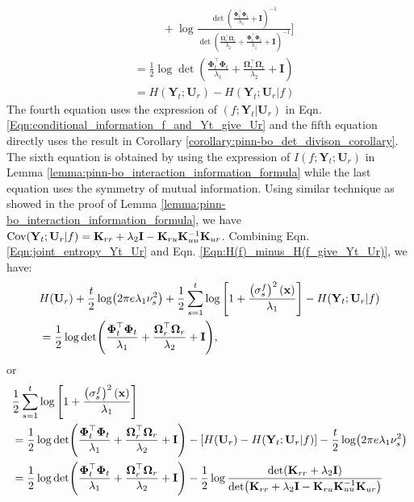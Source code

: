 \begin{align}
\\ 
        & \;\;\; \;\;\; \;\;\;  + \log \frac{\det\left(\frac{\boldsymbol{\Phi}_t^\top \boldsymbol{\Phi}_t}{\lambda_1} + \mathbf{I}\right)^{-1}}{\det \left(\frac{\boldsymbol{\Omega}_r^\top\boldsymbol{\Omega}_r}{\lambda_2}+\frac{\boldsymbol{\Phi}_t^\top \boldsymbol{\Phi}_t} {\lambda_1} + \mathbf{I}\right)^{-1}} \Bigg] \nonumber
\\
        &=\frac{1}{2}\log \det(\frac{\boldsymbol{\Phi}_t^\top \boldsymbol{\Phi}_t}{\lambda_1} + \frac{\boldsymbol{\Omega}_r^\top \boldsymbol{\Omega}_r}{\lambda_2} + \mathbf{I}) \label{Eqn:H(f)_minus_H(f_give_Yt_Ur)}
\\
        &=
        H(\mathbf{Y}_t; \mathbf{U}_r) - H(\mathbf{Y}_t; \mathbf{U}_r \rvert f)  \nonumber
    \end{align} 
    The fourth equation uses the expression of $(f;\mathbf{Y}_t\rvert\mathbf{U}_r)$ in Eqn. \eqref{Eqn:conditional_information_f_and_Yt_give_Ur} and the fifth equation directly uses the result in Corollary \ref{corollary:pinn-bo_det_divison_corollary}.
    The sixth equation is obtained by using the expression of $I(f;\mathbf{Y}_t; \mathbf{U}_r)$  in Lemma \ref{lemma:pinn-bo_interaction_information_formula} while the last equation uses the symmetry of mutual information.
    Using similar technique as showed in the proof of Lemma \ref{lemma:pinn-bo_interaction_information_formula}, we have $\textup{Cov}(\mathbf{Y}_t; \mathbf{U}_r \rvert f) = \mathbf{K}_{rr} + \lambda_2 \mathbf{I} -  \mathbf{K}_{ru} \mathbf{K}_{uu}^{-1} \mathbf{K}_{ur}$. Combining Eqn. \eqref{Eqn:joint_entropy_Yt_Ur} and Eqn. \eqref{Eqn:H(f)_minus_H(f_give_Yt_Ur)}, we have: 
    \begin{align*}
        & H(\mathbf{U}_r) + \frac{t}{2}\log(2\pi e \lambda_1\nu_s^2) + \frac{1}{2}\sum_{s=1}^t \log \left[1+ \frac{\left(\sigma_s^f\right)^2(\mathbf{x})}{\lambda_1}\right] - H(\mathbf{Y}_t; \mathbf{U}_r \rvert f)  \notag
        \\
        &=\frac{1}{2}\log \det(\frac{\boldsymbol{\Phi}_t^\top \boldsymbol{\Phi}_t}{\lambda_1} + \frac{\boldsymbol{\Omega}_r^\top \boldsymbol{\Omega}_r}{\lambda_2} + \mathbf{I}),
    \end{align*}
    or 
    \begin{align*}
      & \frac{1}{2}\sum_{s=1}^t \log \left[1+ \frac{\left(\sigma_s^f\right)^2(\mathbf{x})}{\lambda_1}\right] \notag
      \\
      &= \frac{1}{2}\log \det(\frac{\boldsymbol{\Phi}_t^\top \boldsymbol{\Phi}_t}{\lambda_1} + \frac{\boldsymbol{\Omega}_r^\top \boldsymbol{\Omega}_r}{\lambda_2} + \mathbf{I}) - \left[H(\mathbf{U}_r) - H(\mathbf{Y}_t; \mathbf{U}_r \rvert f) \right] - \frac{t}{2}\log(2\pi e \lambda_1\nu_s^2) 
      \\
      &= \frac{1}{2}\log \det(\frac{\boldsymbol{\Phi}_t^\top \boldsymbol{\Phi}_t}{\lambda_1} + \frac{\boldsymbol{\Omega}_r^\top \boldsymbol{\Omega}_r}{\lambda_2} + \mathbf{I}) - \frac{1}{2} \log \frac{\det (\mathbf{K}_{rr} + \lambda_2\mathbf{I})}{\det(\mathbf{K}_{rr} + \lambda_2 \mathbf{I} -  \mathbf{K}_{ru} \mathbf{K}_{uu}^{-1} \mathbf{K}_{ur})}
    \end{align*}
